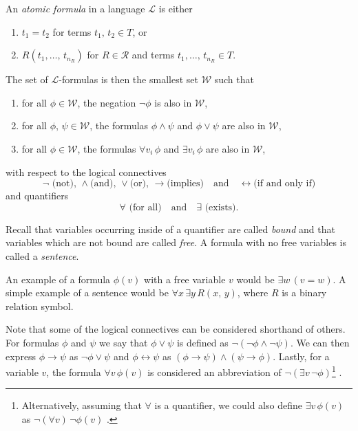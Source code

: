 \documentclass[../../main.tex]{subfiles}
\begin{document}
\begin{definition}\cite[Definition 1.1.5]{Mar02}\label{formula-def}
    An \textit{atomic formula} in a language $\mathcal{L}$ is either
    \begin{enumerate}
        \item $t_1 = t_2$ for terms $t_1,\, t_2 \in T$, or   
        \item $R(t_1,\ldots,\, t_{n_R})$ for $R \in \mathcal{R}$ and terms $t_1,\ldots,\, t_{n_R} \in T$.
    \end{enumerate}
    The set of $\mathcal{L}$-formulas is then the smallest set $\mathcal{W}$ such that
    \begin{enumerate}[label=(\roman*)]
        \item for all $\phi \in \mathcal{W}$, the negation $\lnot \phi$ is also in $\mathcal{W}$,
        \item for all $\phi,\, \psi \in \mathcal{W}$, the formulas $\phi \wedge \psi$ and $\phi \vee \psi$ are also in $\mathcal{W}$,
        \item for all $\phi \in \mathcal{W}$, the formulas $\forall v_i \, \phi$ and $\exists v_i \, \phi$ are also in $\mathcal{W}$,
    \end{enumerate}
    with respect to the logical connectives 
    $$\lnot \text{ (not), } \wedge \text{(and), } \vee \text{(or), } \rightarrow \text{(implies)}\quad \text{and}\quad \leftrightarrow \text{(if and only if)}$$
    and quantifiers $$\forall \text{ (for all)}\quad \text{and}\quad \exists \text{ (exists)}.$$
    
    Recall that variables occurring inside of a quantifier are called \textit{bound} and that variables which are not bound are called \textit{free}.
    A formula with no free variables is called a \textit{sentence}.
\end{definition}
An example of a formula $\phi(v)$ with a free variable $v$ would be $\exists w \, (v = w)$.
A simple example of a sentence would be $\forall x \, \exists y \, R(x,\, y)$, where $R$ is a binary relation symbol.

Note that some of the logical connectives can be considered shorthand of others.
For formulas $\phi$ and $\psi$ we say that $\phi \vee \psi$ is defined as $\lnot \left(\lnot \phi \wedge \lnot \psi\right)$.
We can then express $\phi \rightarrow \psi$ as $\lnot \phi \vee \psi$ and $\phi \leftrightarrow \psi$ as $\left(\phi \rightarrow \psi\right) \wedge \left(\psi \rightarrow \phi\right)$.
Lastly, for a variable $v$, the formula $\forall v\,  \phi(v)$ is considered an abbreviation of $\lnot \left(\exists v\, \lnot \phi\right)$\footnote{
    Alternatively, assuming that $\forall$ is a quantifier, we could also define $\exists v\, \phi(v)$ as $\lnot \left(\forall v\right)\, \lnot \phi(v)$ \cite[p.23]{Cha90}.
} \cite[Remark 1.1.7]{Mar02}.
\end{document}
